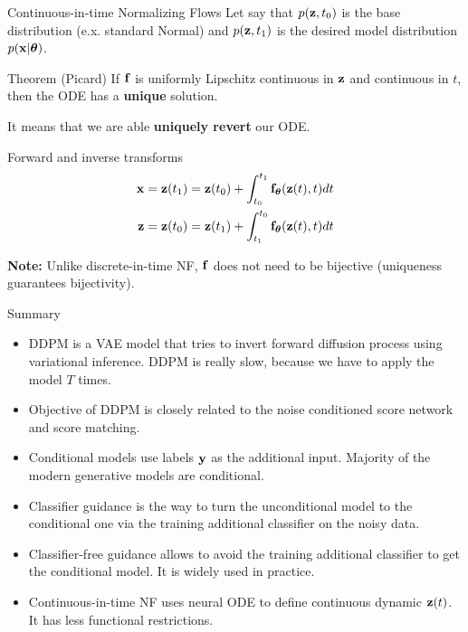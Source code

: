 \begin{frame}{Continuous-in-time Normalizing Flows}
	Let say that $p(\mathbf{z}, t_0)$ is the base distribution (e.x. standard Normal) and $p(\mathbf{z}, t_1)$ is the desired model distribution $p(\mathbf{x} | \boldsymbol{\theta})$.
	\begin{block}{Theorem (Picard)}
		If $\mathbf{f}$ is uniformly Lipschitz continuous in $\mathbf{z}$ and continuous in $t$, then the ODE has a \textbf{unique} solution.
	\end{block}
	It means that we are able \textbf{uniquely revert} our ODE. 
	\begin{block}{Forward and inverse transforms}
		\vspace{-0.7cm}
		\begin{align*}
			\mathbf{x} &= \mathbf{z}(t_1) = \mathbf{z}(t_0) + \int_{t_0}^{t_1} \mathbf{f}_{\boldsymbol{\theta}}(\mathbf{z}(t), t) dt \\
			\mathbf{z} &= \mathbf{z}(t_0) = \mathbf{z}(t_1) + \int_{t_1}^{t_0} \mathbf{f}_{\boldsymbol{\theta}}(\mathbf{z}(t), t) dt
		\end{align*}
		\vspace{-0.7cm}
	\end{block}
	\textbf{Note:} Unlike discrete-in-time NF, $\mathbf{f}$ does not need to be bijective (uniqueness guarantees bijectivity).
\end{frame}
\begin{frame}{Summary}
	\begin{itemize}
		\item DDPM is a VAE model that tries to invert forward diffusion process using variational inference. DDPM is really slow, because we have to apply the model $T$ times.
		\vfill
		\item Objective of DDPM is closely related to the noise conditioned score network and score matching.	
		\vfill
		\item Conditional models use labels $\mathbf{y}$ as the additional input. Majority of the modern generative models are conditional.
		\vfill
		\item Classifier guidance is the way to turn the unconditional model to the conditional one via the training additional classifier on the noisy data.
		\vfill
		\item Classifier-free guidance allows to avoid the training additional classifier to get the conditional model. It is widely used in practice.
		\vfill 
		\item Continuous-in-time NF uses neural ODE to define continuous dynamic $\mathbf{z}(t)$. It has less functional restrictions.
	\end{itemize}
\end{frame}
 